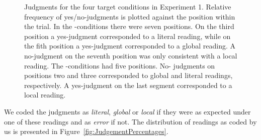 \documentclass[fleqn,reqno,10pt,draft]{article}
\newcommand{\as}{\acro{as}}
\renewcommand{\es}{\acro{es}}
\begin{document}
\begin{figure}[]
\caption[Optional caption for list of figures]{Judgments for the four
  target conditions in Experiment 1. Relative frequency of
  yes/no-judgments is plotted against the position within the
  trial. In the \as-conditions there were seven positions. On the
  third position a yes-judgment corresponded to a literal reading,
  while on the fith position a yes-judgment corresponded to a global
  reading.  A no-judgment on the seventh position was only consistent
  with a local reading. The \es-conditions had five
  positions. No- judgments on positions two and three corresponded to
  global and literal readings, respectively. A yes-judgment on the
  last segment corresponded to a local reading. }
\label{fig:JudgmentsK2}
\end{figure}
%
We coded the judgments as {\it literal}, {\it global} or {\it local}
if they were as expected under one of these readings and as {\it
  error} if not. The distribution of readings as coded by us is
presented in Figure~\ref{fig:JudgementPercentages}.
%
\end{document}
